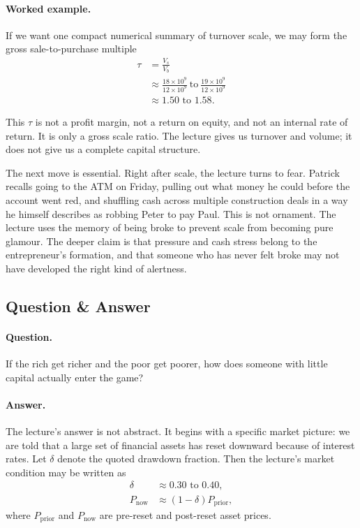 \paragraph{Worked example.} If we want one compact numerical summary of turnover scale, we may form the gross sale-to-purchase multiple
\begin{align}
\tau &= \frac{V_s}{V_b}\\
&\approx \frac{18\times 10^9}{12\times 10^9}\ \text{to}\ \frac{19\times 10^9}{12\times 10^9}\\
&\approx 1.50\text{ to }1.58.
\end{align}

This \(\tau\) is not a profit margin, not a return on equity, and not an internal rate of return. It is only a gross scale ratio. The lecture gives us turnover and volume; it does not give us a complete capital structure.

The next move is essential. Right after scale, the lecture turns to fear. Patrick recalls going to the ATM on Friday, pulling out what money he could before the account went red, and shuffling cash across multiple construction deals in a way he himself describes as robbing Peter to pay Paul. This is not ornament. The lecture uses the memory of being broke to prevent scale from becoming pure glamour. The deeper claim is that pressure and cash stress belong to the entrepreneur's formation, and that someone who has never felt broke may not have developed the right kind of alertness.

\subsection{Question \& Answer}

\paragraph{Question.} If the rich get richer and the poor get poorer, how does someone with little capital actually enter the game?

\paragraph{Answer.} The lecture's answer is not abstract. It begins with a specific market picture: we are told that a large set of financial assets has reset downward because of interest rates. Let \(\delta\) denote the quoted drawdown fraction. Then the lecture's market condition may be written as
\begin{align}
\delta &\approx 0.30\text{ to }0.40,\\
P_{\text{now}} &\approx (1-\delta)P_{\text{prior}},
\end{align}
where \(P_{\text{prior}}\) and \(P_{\text{now}}\) are pre-reset and post-reset asset prices.


